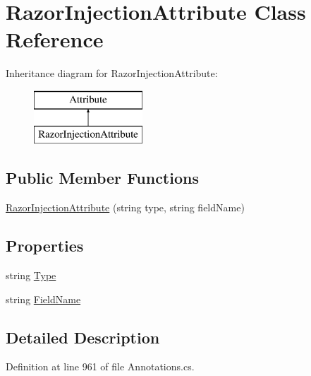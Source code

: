 \hypertarget{class_razor_injection_attribute}{}\section{Razor\+Injection\+Attribute Class Reference}
\label{class_razor_injection_attribute}
Inheritance diagram for Razor\+Injection\+Attribute\+:\begin{figure}[H]
\begin{center}
\leavevmode
\includegraphics[height=2.000000cm]{class_razor_injection_attribute}
\end{center}
\end{figure}
\subsection*{Public Member Functions}
\begin{DoxyCompactItemize}
\item 
\hyperlink{class_razor_injection_attribute_a16b318ef8474449bae084dbe8377d77e}{Razor\+Injection\+Attribute} (string type, string field\+Name)
\end{DoxyCompactItemize}
\subsection*{Properties}
\begin{DoxyCompactItemize}
\item 
string \hyperlink{class_razor_injection_attribute_a03ab3ec12db49f3eeca9d462b95bb6fd}{Type}
\item 
string \hyperlink{class_razor_injection_attribute_ace7a81f227c76db0a47cca6edb85a911}{Field\+Name}
\end{DoxyCompactItemize}


\subsection{Detailed Description}


Definition at line 961 of file Annotations.\+cs.



